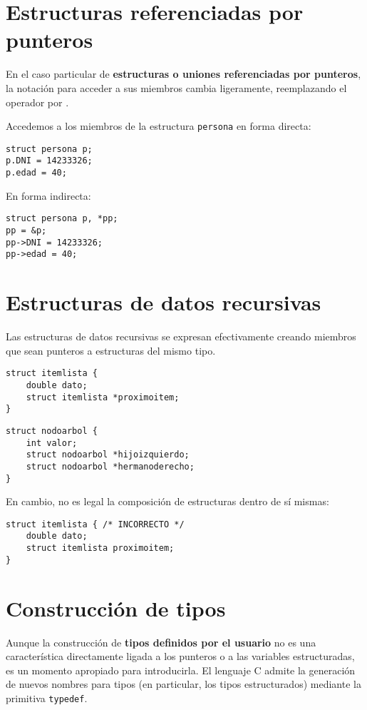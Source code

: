 \section{Estructuras referenciadas por punteros}
En el caso particular de \textbf{estructuras o uniones referenciadas por punteros}, la
notación para acceder a sus miembros cambia ligeramente, reemplazando el
operador  por \quotes{\lstinline{->}}.

\begin{ejemplo}
Accedemos a los miembros de la estructura \lstinline{persona} en forma directa:
\begin{lstlisting}
struct persona p;
p.DNI = 14233326;
p.edad = 40;
\end{lstlisting}
En forma indirecta:
\begin{lstlisting}
struct persona p, *pp;
pp = &p;
pp->DNI = 14233326;
pp->edad = 40;
\end{lstlisting}
\end{ejemplo}


\section{Estructuras de datos recursivas}
Las estructuras de datos recursivas se expresan efectivamente creando miembros que sean punteros a
estructuras del mismo tipo.
\begin{lstlisting}
struct itemlista {
    double dato;
    struct itemlista *proximoitem;
}
\end{lstlisting}

\begin{lstlisting}
struct nodoarbol {
    int valor;
    struct nodoarbol *hijoizquierdo;
    struct nodoarbol *hermanoderecho;
}
\end{lstlisting}

En cambio, no es legal la composición de estructuras dentro de sí mismas:
\begin{lstlisting}
struct itemlista { /* INCORRECTO */
    double dato;
    struct itemlista proximoitem;
}
\end{lstlisting}

\section{Construcción de tipos}
Aunque la construcción de \textbf{tipos definidos por el usuario} no es una
característica directamente ligada a los punteros o a las variables
estructuradas, es un momento apropiado para introducirla. El lenguaje C admite la
generación de nuevos nombres para tipos (en particular, los tipos estructurados) mediante la primitiva
\lstinline{typedef}.

